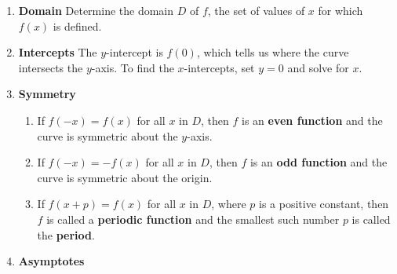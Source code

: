\documentclass{article}
\begin{document}
\begin{enumerate}[leftmargin=5pt, labelindent=16pt]
	\item \textbf{Domain} \: Determine the domain $D$ of $f$, the set of values of $x$ for which $f(x)$ is defined. \\
	\item \textbf{Intercepts} \: The $y$-intercept is $f(0)$, which tells us where the curve intersects the $y$-axis.  To find the $x$-intercepts, set $y=0$ and solve for $x$. \\
	\item \textbf{Symmetry} \: \vspace{5pt}

		\begin{enumerate}[label=(\roman*)]
		\item If $f(-x) = f(x)$ for all $x$ in $D$, then $f$ is an \textbf{even function} and the curve is symmetric about the $y$-axis. \vspace{5pt}
		\item If $f(-x) = -f(x)$ for all $x$ in $D$, then $f$ is an \textbf{odd function} and the curve is symmetric about the origin. \vspace{5pt}
		\item If $f(x+p) = f(x)$ for all $x$ in $D$, where $p$ is a positive constant, then $f$ is called a \textbf{periodic function} and the smallest such number $p$ is called the \textbf{period}. \\
		\end{enumerate}
	\item \textbf{Asymptotes} \: \vspace{5pt}


\end{enumerate}
\end{document}
